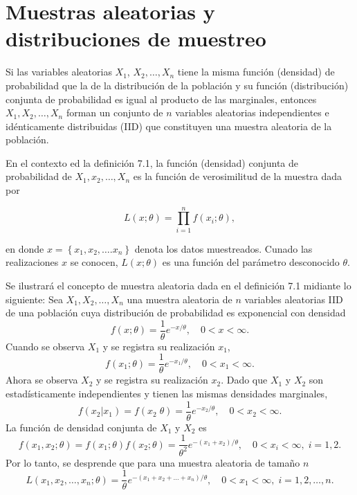 \chapter{Muestras aleatorias y distribuciones de muestreo}

\begin{def.}
    Si las variables aleatorias $X_1$, $X_2,\ldots, X_n$ tiene la misma función (densidad) de probabilidad que la de la distribución de la población y su función (distribución) conjunta de probabilidad es igual al producto de las marginales, entonces $X_1,X_2,\ldots , X_n$ forman un conjunto de $n$ variables aleatorias independientes e idénticamente distribuidas (IID) que constituyen una muestra aleatoria de la población.
\end{def.}

En el contexto ed la definición 7.1, la función (densidad) conjunta de probabilidad de $X_1,x_2,\ldots,X_n$ es la función de verosimilitud de la muestra dada por
\begin{tcolorbox}
    $$ L(x;\theta)=\prod\limits_{i=1}^n f(x_i; \theta),$$
\end{tcolorbox}
    en donde $x=\left\{x_1,x_2,\ldots.x_n\right\}$ denota los datos muestreados. Cunado las realizaciones $x$ se conocen, $L(x;\theta)$ es una función del parámetro desconocido $\theta$. 

\begin{ejem}
    Se ilustrará el concepto de muestra aleatoria dada en el definición 7.1 midiante lo siguiente: Sea $X_1,X_2,\ldots,X_n$ una muestra aleatoria de $n$ variables aleatorias IID de una población cuya distribución de probabilidad es exponencial con densidad
    $$f(x;\theta)=\dfrac{1}{\theta}e^{-x/\theta},\quad 0<x<\infty.$$
    Cuando se observa $X_1$ y se registra su realización $x_1$,
    $$f(x_1;\theta)=\dfrac{1}{\theta}e^{-x_1/\theta},\quad 0<x_1<\infty.$$
    Ahora se observa $X_2$ y se registra su realización $x_2$. Dado que $X_1$ y $X_2$ son estadísticamente independientes y tienen las mismas densidades marginales,
    $$f(x_2|x_1)=f(x_2\; \theta)=\dfrac{1}{\theta}e^{-x_2/\theta},\quad 0<x_2<\infty.$$
    La función de densidad conjunta de $X_1$ y $X_2$ es
    $$f(x_1,x_2;\theta)=f(x_1;\theta)f(x_2;\theta)=\dfrac{1}{\theta^2}e^{-(x_1+x_2)/\theta},\quad 0<x_i<\infty,\; i=1,2.$$
    Por lo tanto, se desprende que para una muestra aleatoria de tamaño $n$
    $$L(x_1,x_2,\ldots,x_n; \theta)=\dfrac{1}{\theta}e^{-(x_1+x_2+\ldots +x_n)/\theta},\quad 0<x_1<\infty,\; i=1,2,\ldots,n.$$
\end{ejem}

